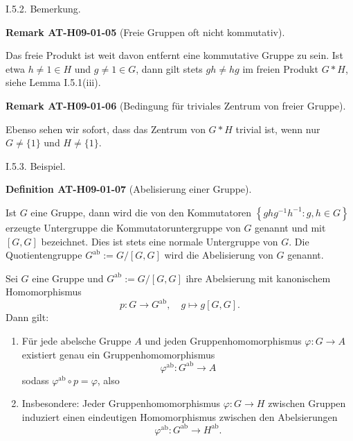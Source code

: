 \documentclass[10pt, letterpaper]{article}
\newcommand{\CustomHeading}[3]{%
  \par\medskip\noindent%
  \textbf{#1 #2} \textnormal{(#3)}.\enskip%
}
\newenvironment{DEF}[2]{\begin{unitbox}\CustomHeading{Definition}{#1}{#2}}{\end{unitbox}}
\newenvironment{REM}[2]{\begin{unitbox}\CustomHeading{Remark}{#1}{#2}}{\end{unitbox}}
\begin{document}
I.5.2. Bemerkung. 

\begin{REM}{AT-H09-01-05}{Freie Gruppen oft nicht kommutativ}
Das freie Produkt ist weit davon entfernt eine kommutative Gruppe zu sein. Ist etwa $h \neq 1 \in H$ und $g \neq 1 \in G$, dann gilt stets $g h \neq h g$ im freien Produkt $G * H$, siehe Lemma I.5.1(iii).
\end{REM}

\begin{REM}{AT-H09-01-06}{Bedingung für triviales Zentrum von freier Gruppe}
Ebenso sehen wir sofort, dass das Zentrum von $G * H$ trivial ist, wenn nur $G \neq\{1\}$ und $H \neq\{1\}$.
\end{REM}


I.5.3. Beispiel. 

\begin{DEF}{AT-H09-01-07}{Abelisierung einer Gruppe}
Ist $G$ eine Gruppe, dann wird die von den Kommutatoren $\left\{g h g^{-1} h^{-1}: g, h \in G\right\}$ erzeugte Untergruppe die Kommutatoruntergruppe von $G$ genannt und mit $[G, G]$ bezeichnet. Dies ist stets eine normale Untergruppe von $G$. Die Quotientengruppe $G^{\mathrm{ab}}:=G /[G, G]$ wird die Abelisierung von $G$ genannt.
\end{DEF}



Sei $G$ eine Gruppe und $G^{\mathrm{ab}} := G/[G, G]$ ihre Abelsierung mit kanonischem Homomorphismus
\[
p: G \rightarrow G^{\mathrm{ab}}, \quad g \mapsto g [G, G].
\]
Dann gilt:

\begin{enumerate}
  \item Für jede abelsche Gruppe $A$ und jeden Gruppenhomomorphismus $\varphi: G \rightarrow A$ existiert genau ein Gruppenhomomorphismus
  \[
  \varphi^{\mathrm{ab}}: G^{\mathrm{ab}} \rightarrow A
  \]
  sodass $\varphi^{\mathrm{ab}} \circ p = \varphi$, also
  \begin{center}
  \end{center}
  \item Insbesondere: Jeder Gruppenhomomorphismus $\varphi: G \rightarrow H$ zwischen Gruppen induziert einen eindeutigen Homomorphismus zwischen den Abelsierungen
  \[
  \varphi^{\mathrm{ab}}: G^{\mathrm{ab}} \rightarrow H^{\mathrm{ab}}.
  \]
\end{enumerate}
\end{document}
